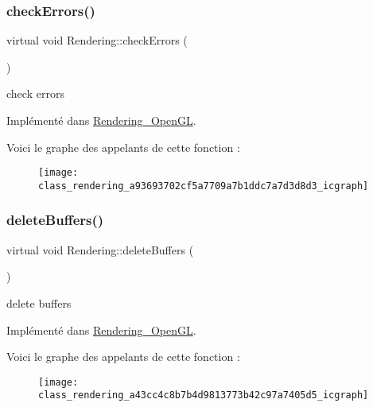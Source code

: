 \subsubsection{\texorpdfstring{check\+Errors()}{checkErrors()}}
{\footnotesize\ttfamily virtual void Rendering\+::check\+Errors (\begin{DoxyParamCaption}{ }\end{DoxyParamCaption})\hspace{0.3cm}{\ttfamily [pure virtual]}}



check errors 



Implémenté dans \hyperlink{class_rendering___open_g_l_a9621079239b6b621dfc8f9c4e93bdd7a}{Rendering\+\_\+\+Open\+GL}.

Voici le graphe des appelants de cette fonction \+:\nopagebreak
\begin{figure}[H]
\begin{center}
\leavevmode
\texttt{[image: class\_rendering\_a93693702cf5a7709a7b1ddc7a7d3d8d3\_icgraph]}
\end{center}
\end{figure}
\mbox{\label{class_rendering_a43cc4c8b7b4d9813773b42c97a7405d5}} 
\subsubsection{\texorpdfstring{delete\+Buffers()}{deleteBuffers()}}
{\footnotesize\ttfamily virtual void Rendering\+::delete\+Buffers (\begin{DoxyParamCaption}{ }\end{DoxyParamCaption})\hspace{0.3cm}{\ttfamily [pure virtual]}}



delete buffers 



Implémenté dans \hyperlink{class_rendering___open_g_l_aab5b195bb52751243f4944417f9ae7d5}{Rendering\+\_\+\+Open\+GL}.

Voici le graphe des appelants de cette fonction \+:\nopagebreak
\begin{figure}[H]
\begin{center}
\leavevmode
\texttt{[image: class\_rendering\_a43cc4c8b7b4d9813773b42c97a7405d5\_icgraph]}
\end{center}
\end{figure}
\mbox{\label{class_rendering_abeffb3c261cd9b5c6b885aaf8e321ef2}} 
